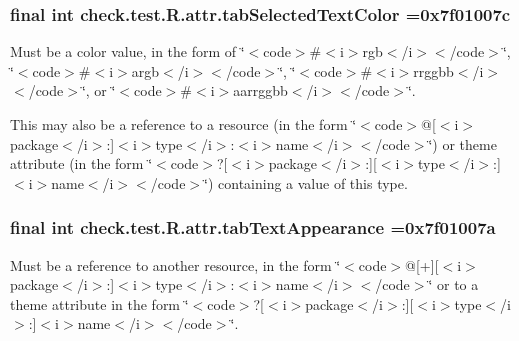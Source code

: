\subsubsection[{tab\+Selected\+Text\+Color}]{\setlength{\rightskip}{0pt plus 5cm}final int check.\+test.\+R.\+attr.\+tab\+Selected\+Text\+Color =0x7f01007c\hspace{0.3cm}{\ttfamily [static]}}\label{classcheck_1_1test_1_1_r_1_1attr_a270a1ff857735c964f5bcf59290f4b71}
Must be a color value, in the form of \char`\"{}$<$code$>$\#$<$i$>$rgb$<$/i$>$$<$/code$>$\char`\"{}, \char`\"{}$<$code$>$\#$<$i$>$argb$<$/i$>$$<$/code$>$\char`\"{}, \char`\"{}$<$code$>$\#$<$i$>$rrggbb$<$/i$>$$<$/code$>$\char`\"{}, or \char`\"{}$<$code$>$\#$<$i$>$aarrggbb$<$/i$>$$<$/code$>$\char`\"{}. 

This may also be a reference to a resource (in the form \char`\"{}$<$code$>$@\mbox{[}$<$i$>$package$<$/i$>$\+:\mbox{]}$<$i$>$type$<$/i$>$\+:$<$i$>$name$<$/i$>$$<$/code$>$\char`\"{}) or theme attribute (in the form \char`\"{}$<$code$>$?\mbox{[}$<$i$>$package$<$/i$>$\+:\mbox{]}\mbox{[}$<$i$>$type$<$/i$>$\+:\mbox{]}$<$i$>$name$<$/i$>$$<$/code$>$\char`\"{}) containing a value of this type. \hypertarget{classcheck_1_1test_1_1_r_1_1attr_ab5c0ef23c7153d895773e5776a6bedee}{}
\subsubsection[{tab\+Text\+Appearance}]{\setlength{\rightskip}{0pt plus 5cm}final int check.\+test.\+R.\+attr.\+tab\+Text\+Appearance =0x7f01007a\hspace{0.3cm}{\ttfamily [static]}}\label{classcheck_1_1test_1_1_r_1_1attr_ab5c0ef23c7153d895773e5776a6bedee}
Must be a reference to another resource, in the form \char`\"{}$<$code$>$@\mbox{[}+\mbox{]}\mbox{[}$<$i$>$package$<$/i$>$\+:\mbox{]}$<$i$>$type$<$/i$>$\+:$<$i$>$name$<$/i$>$$<$/code$>$\char`\"{} or to a theme attribute in the form \char`\"{}$<$code$>$?\mbox{[}$<$i$>$package$<$/i$>$\+:\mbox{]}\mbox{[}$<$i$>$type$<$/i$>$\+:\mbox{]}$<$i$>$name$<$/i$>$$<$/code$>$\char`\"{}. \hypertarget{classcheck_1_1test_1_1_r_1_1attr_a5429daadf498e6cbc4dec50f3c1251e3}{}
